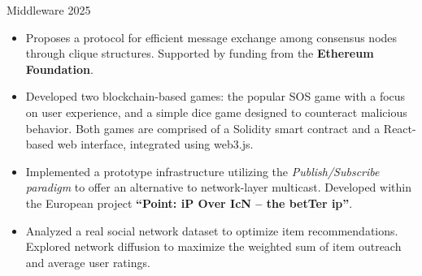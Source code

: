 \documentclass[10pt,a4paper,ragged2e,withhyper]{altacv}
\begin{document}
\begin{paracol}{2}
             {Middleware 2025}
            \begin{itemize}
                \item[] Proposes a protocol for efficient message exchange among consensus nodes through clique structures. Supported by funding from the \textbf{Ethereum Foundation}.
            \end{itemize}
        
            \begin{itemize}
                \item[] Developed two blockchain-based games: the popular SOS game with a focus on user experience, and a simple dice game designed to counteract malicious behavior. Both games are comprised of a Solidity smart contract and a React-based web interface, integrated using web3.js.
            \end{itemize}
            \divider

            \begin{itemize}
                \item[] Implemented a prototype infrastructure utilizing the \emph{Publish/Subscribe paradigm} to offer an alternative to network-layer multicast. Developed within the European project \textbf{``Point: iP Over IcN – the betTer ip''}.
            \end{itemize}
            \divider

            \begin{itemize}
                \item[] Analyzed a real social network dataset to optimize item recommendations. Explored network diffusion to maximize the weighted sum of item outreach and average user ratings.
            \end{itemize}
    \end{paracol}
\end{document}
